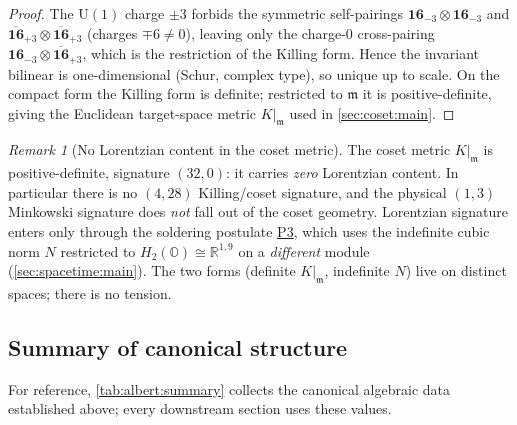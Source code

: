 \documentclass[11pt]{article}
\theoremstyle{plain}
\theoremstyle{definition}
\theoremstyle{remark}
\newtheorem{remark}[theorem]{Remark}
\begin{document}
\begin{proof}
The $\mathrm{U}(1)$ charge $\pm3$ forbids the symmetric self-pairings
$\mathbf{16}_{-3}\!\otimes\!\mathbf{16}_{-3}$ and
$\overline{\mathbf{16}}_{+3}\!\otimes\!\overline{\mathbf{16}}_{+3}$
(charges $\mp6\neq0$), leaving only the charge-$0$ cross-pairing
$\mathbf{16}_{-3}\!\otimes\!\overline{\mathbf{16}}_{+3}$, which is the
restriction of the Killing form. Hence the invariant bilinear is
one-dimensional (Schur, complex type), so unique up to scale. On the
compact form the Killing form is definite; restricted to $\mathfrak{m}$
it is positive-definite, giving the Euclidean target-space metric
$K|_{\mathfrak{m}}$ used in \autoref{sec:coset:main}.
\end{proof}

\begin{remark}[No Lorentzian content in the coset metric]\label{rmk:albert:nolorentz}
The coset metric $K|_{\mathfrak{m}}$ is positive-definite, signature
$(32,0)$: it carries \emph{zero} Lorentzian content. In particular there
is no $(4,28)$ Killing/coset signature, and the physical $(1,3)$ Minkowski
signature does \emph{not} fall out of the coset geometry. Lorentzian
signature enters only through the soldering postulate
\hyperref[post:spacetime:P3master]{P3}, which uses the indefinite cubic norm
$N$ restricted to $H_{2}(\mathbb{O})\cong\mathbb{R}^{1,9}$ on a
\emph{different} module (\autoref{sec:spacetime:main}). The two forms
(definite $K|_{\mathfrak{m}}$, indefinite $N$) live on distinct spaces;
there is no tension.
\end{remark}

\subsection{Summary of canonical structure}
\label{sec:albert:summary}

For reference, \autoref{tab:albert:summary} collects the canonical
algebraic data established above; every downstream section uses these
values.
\end{document}
